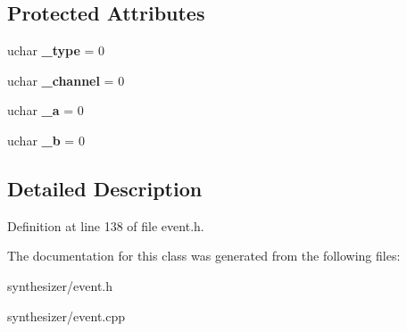 \subsection*{Protected Attributes}
\begin{DoxyCompactItemize}
\item 
\mbox{\label{class_ms_1_1_midi_core_event_a2decd305849687cab9c5f7d3388a3191}} 
uchar {\bfseries \+\_\+type} = 0
\item 
\mbox{\label{class_ms_1_1_midi_core_event_afbeb23688341bb22c6ec476b6985b3a5}} 
uchar {\bfseries \+\_\+channel} = 0
\item 
\mbox{\label{class_ms_1_1_midi_core_event_a4aecec1aee0a8a6f3813e28ebce68a5e}} 
uchar {\bfseries \+\_\+a} = 0
\item 
\mbox{\label{class_ms_1_1_midi_core_event_a883018f1e2d1268fa3e05a03526a87b7}} 
uchar {\bfseries \+\_\+b} = 0
\end{DoxyCompactItemize}


\subsection{Detailed Description}


Definition at line 138 of file event.\+h.



The documentation for this class was generated from the following files\+:\begin{DoxyCompactItemize}
\item 
synthesizer/event.\+h\item 
synthesizer/event.\+cpp\end{DoxyCompactItemize}

